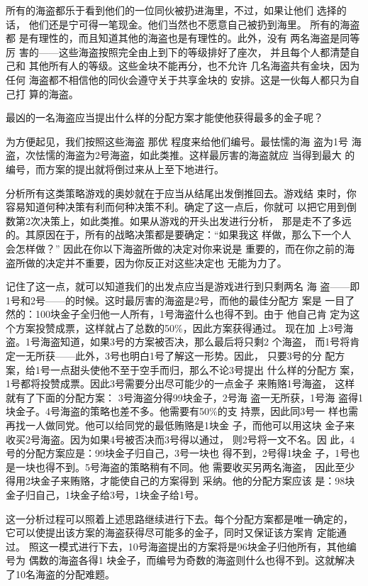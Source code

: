 所有的海盗都乐于看到他们的一位同伙被扔进海里，不过，如果让他们 选择的话，
他们还是宁可得一笔现金。他们当然也不愿意自己被扔到海里。  所有的海盗都
是有理性的，而且知道其他的海盗也是有理性的。此外，没有 两名海盗是同等厉
害的——这些海盗按照完全由上到下的等级排好了座次， 并且每个人都清楚自己和
其他所有人的等级。这些金块不能再分，也不允许 几名海盗共有金块，因为任何
海盗都不相信他的同伙会遵守关于共享金块的 安排。这是一伙每人都只为自己打
算的海盗。

最凶的一名海盗应当提出什么样的分配方案才能使他获得最多的金子呢？
    
为方便起见，我们按照这些海盗 那优 程度来给他们编号。最怯懦的海 盗为1号
海盗，次怯懦的海盗为2号海盗，如此类推。这样最厉害的海盗就应 当得到最大
的编号，而方案的提出就将倒过来从上至下地进行。
    
分析所有这类策略游戏的奥妙就在于应当从结尾出发倒推回去。游戏结 束时，你
容易知道何种决策有利而何种决策不利。确定了这一点后，你就可 以把它用到倒
数第2次决策上，如此类推。如果从游戏的开头出发进行分析， 那是走不了多远
的。其原因在于，所有的战略决策都是要确定：“如果我这 样做，那么下一个人
会怎样做？” 因此在你以下海盗所做的决定对你来说是 重要的，而在你之前的海
盗所做的决定并不重要，因为你反正对这些决定也 无能为力了。
    
记住了这一点，就可以知道我们的出发点应当是游戏进行到只剩两名
海 盗——即1号和2号——的时候。这时最厉害的海盗是2号，而他的最佳分配方 案是
一目了然的：100块金子全归他一人所有，1号海盗什么也得不到。由于 他自己肯
定为这个方案投赞成票，这样就占了总数的50\%，因此方案获得通过。  现在加
上3号海盗。1号海盗知道，如果3号的方案被否决，那么最后将只剩2 个海盗，
而1号将肯定一无所获——此外，3号也明白1号了解这一形势。因此， 只要3号的分
配方案，给1号一点甜头使他不至于空手而归，那么不论3号提出 什么样的分配方
案，1号都将投赞成票。因此3号需要分出尽可能少的一点金子 来贿赂1号海盗，
这样就有了下面的分配方案： 3号海盗分得99块金子，2号海 盗一无所获，1号海
盗得1块金子。4号海盗的策略也差不多。他需要有50\%的支 持票，因此同3号一
样也需再找一人做同党。他可以给同党的最低贿赂是1块金 子，而他可以用这块
金子来收买2号海盗。因为如果4号被否决而3号得以通过， 则2号将一文不名。因
此，4号的分配方案应是：99块金子归自己，3号一块也 得不到，2号得1块金
子，1号也是一块也得不到。5号海盗的策略稍有不同。他 需要收买另两名海盗，
因此至少得用2块金子来贿赂，才能使自己的方案得到 采纳。他的分配方案应该
是：98块金子归自己，1块金子给3号，1块金子给1号。
  
    
这一分析过程可以照着上述思路继续进行下去。每个分配方案都是唯一确定的，
它可以使提出该方案的海盗获得尽可能多的金子，同时又保证该方案肯 定能通过。
照这一模式进行下去，10号海盗提出的方案将是96块金子归他所有，其他编号为
偶数的海盗各得1 块金子，而编号为奇数的海盗则什么也得不到。这就解决
了10名海盗的分配难题。
    
